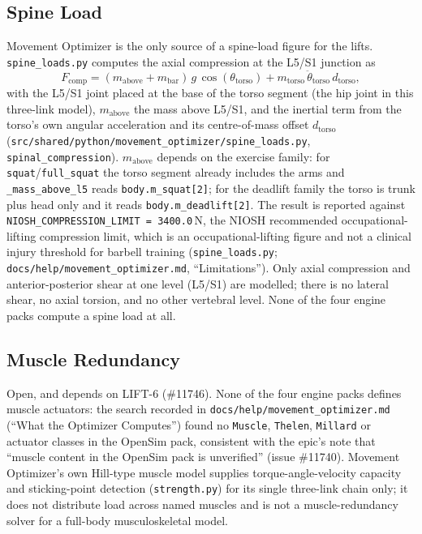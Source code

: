 \documentclass[11pt,a4paper]{article}
\begin{document}
\subsection{Spine Load}
Movement Optimizer is the only source of a spine-load figure for the lifts.
\texttt{spine\_loads.py} computes the axial compression at the L5/S1 junction
as
\[
F_{\mathrm{comp}} = (m_{\mathrm{above}} + m_{\mathrm{bar}})\,g\,\cos(\theta_{\mathrm{torso}})
  + m_{\mathrm{torso}}\,\ddot\theta_{\mathrm{torso}}\,d_{\mathrm{torso}},
\]
with the L5/S1 joint placed at the base of the torso segment (the hip joint
in this three-link model), $m_{\mathrm{above}}$ the mass above L5/S1, and the
inertial term from the torso's own angular acceleration and its
centre-of-mass offset $d_{\mathrm{torso}}$
(\texttt{src/shared/python/movement\_optimizer/spine\_loads.py},
\texttt{spinal\_compression}). $m_{\mathrm{above}}$ depends on the exercise
family: for \texttt{squat}/\texttt{full\_squat} the torso segment already
includes the arms and \texttt{\_mass\_above\_l5} reads \texttt{body.m\_squat[2]};
for the deadlift family the torso is trunk plus head only and it reads
\texttt{body.m\_deadlift[2]}. The result is reported against
\texttt{NIOSH\_COMPRESSION\_LIMIT = 3400.0}\,N, the NIOSH recommended
occupational-lifting compression limit, which is an occupational-lifting
figure and not a clinical injury threshold for barbell training
(\texttt{spine\_loads.py}; \texttt{docs/help/movement\_optimizer.md},
``Limitations''). Only axial compression and anterior-posterior shear at one
level (L5/S1) are modelled; there is no lateral shear, no axial torsion, and
no other vertebral level. None of the four engine packs compute a spine load
at all.

\subsection{Muscle Redundancy}
Open, and depends on LIFT-6 (\#11746). None of the four engine packs
defines muscle actuators: the search recorded in
\texttt{docs/help/movement\_optimizer.md} (``What the Optimizer Computes'')
found no \texttt{Muscle}, \texttt{Thelen},
\texttt{Millard} or actuator classes in the OpenSim pack, consistent with the
epic's note that ``muscle content in the OpenSim pack is unverified'' (issue
\#11740). Movement Optimizer's own Hill-type muscle model
supplies torque-angle-velocity capacity and sticking-point detection
(\texttt{strength.py}) for its single three-link chain only; it does not
distribute load across named muscles and is not a muscle-redundancy solver
for a full-body musculoskeletal model.
\end{document}
